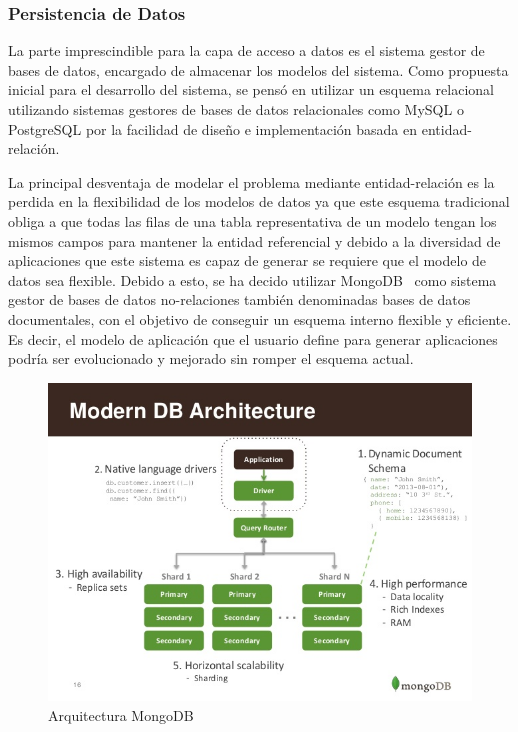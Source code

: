 \documentclass[a4paper,11pt]{book}
\begin{document}
\subsubsection{Persistencia de Datos}

La parte imprescindible para la capa de acceso a datos es el sistema gestor de bases de datos, encargado de almacenar los modelos del sistema. Como propuesta inicial para el desarrollo del sistema, se pensó en utilizar un esquema relacional utilizando sistemas gestores de bases de datos relacionales como MySQL o PostgreSQL  por la facilidad de diseño e implementación basada en entidad-relación.

La principal desventaja de modelar el problema mediante entidad-relación es la perdida en la flexibilidad de los modelos de datos ya que este esquema tradicional obliga a que todas las filas de una tabla representativa de un modelo tengan los mismos campos para mantener la entidad referencial y debido a la diversidad de aplicaciones que este sistema es capaz de generar se requiere que el modelo de datos sea flexible. Debido a esto, se ha decido utilizar MongoDB~\cite{mg} como sistema gestor de bases de datos no-relaciones también denominadas bases de datos documentales, con el objetivo de conseguir un esquema interno flexible y eficiente. Es decir, el modelo de aplicación que el usuario define para generar aplicaciones podría ser evolucionado y mejorado sin romper el esquema actual. 

\begin{figure}[H]
\centering
\includegraphics[scale=0.30]{imagenes/mongo.jpg}
\caption{ Arquitectura MongoDB~\cite{mongoA}  }
\end{figure}
\end{document}
